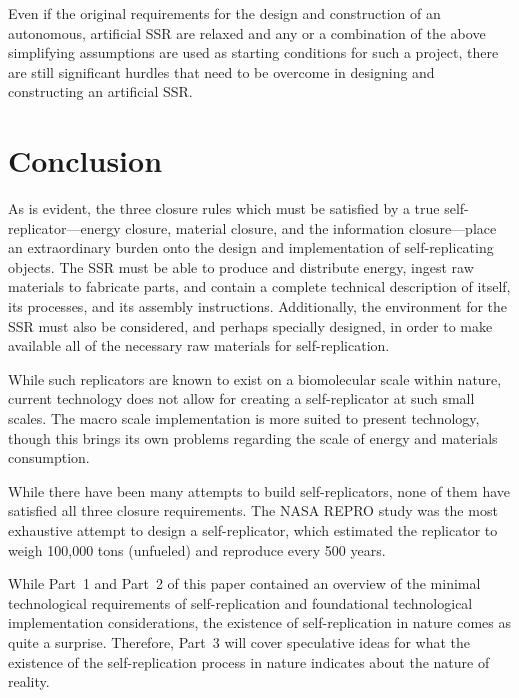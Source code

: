 Even if the original requirements for the design and construction of an
autonomous, artificial SSR are relaxed and any or a combination of the
above simplifying assumptions are used as starting conditions for such
a project, there are still significant hurdles that need to be overcome
in designing and constructing an artificial SSR.

\section{Conclusion}

As is evident, the three closure rules which must be satisfied by a
true self-replicator---energy closure, material closure, 
and the information closure---place an extraordinary burden onto
the design and implementation of self-replicating objects.  The
SSR must be able to produce and distribute energy, ingest raw
materials to fabricate parts, and contain a complete technical
description of itself, its processes, and its assembly instructions.
Additionally, the environment for the SSR must also be considered, 
and perhaps specially designed, in order to make available all
of the necessary raw materials for self-replication.

While such replicators are known to exist on a biomolecular scale within nature,
current technology does not allow for creating a self-replicator 
at such small scales.  The macro scale implementation is more suited
to present technology, though this brings its own problems regarding 
the scale of energy and materials consumption.  

While there have been many attempts to build self-replicators, none of them have
satisfied all three closure requirements.  The NASA REPRO study was the most
exhaustive attempt to design a self-replicator, which estimated the replicator
to weigh 100,000 tons (unfueled) and reproduce every 500 years.

While Part~1 and Part~2 of this paper contained an overview of the minimal technological
requirements of self-replication and foundational technological implementation considerations,
the existence of self-replication in nature comes as quite a surprise.  Therefore, Part~3
will cover speculative ideas for what the existence of the self-replication process in
nature indicates about the nature of reality.


